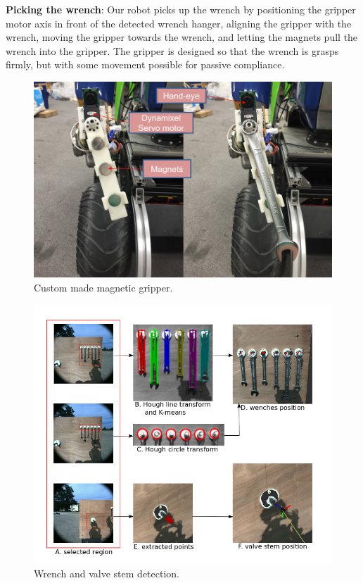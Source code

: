 \documentclass{standalone}
\begin{document}
\textbf{Picking the wrench}: Our robot picks up the wrench by positioning the gripper motor axis in front of the detected wrench hanger, aligning the gripper with the wrench, moving the gripper towards the wrench, and letting the magnets pull the wrench into the gripper. The gripper is designed so that the wrench is grasps firmly, but with some movement possible for passive compliance.

\begin{figure}
  \includegraphics[width=\columnwidth]{sections/task2/images/gripper}
  \caption{Custom made magnetic gripper.}
  \label{fig:figure2}
\end{figure}

\begin{figure}[b]
  \includegraphics[width=\columnwidth]{sections/task2/images/detection}
  \caption{Wrench and valve stem detection.}
  \label{fig:figure3}
\end{figure}
\end{document}
